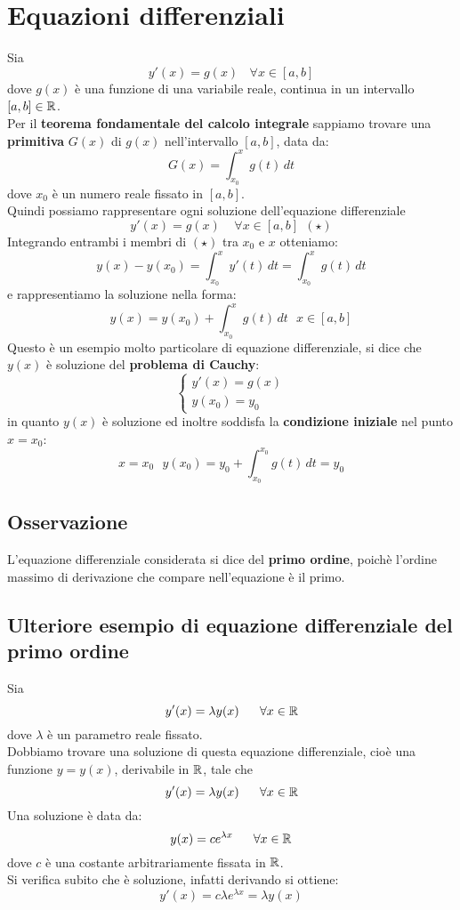 \documentclass[../main.tex]{subfiles}
\begin{document}
\section{Equazioni differenziali}
Sia
\[
    y'(x) = g(x) \ \ \ \ \forall x \in [a, b]
\]
dove $g(x)$ è una funzione di una variabile reale, continua in un intervallo
$[a, b] \in \mathbb{R}$.\\ Per il \textbf{teorema fondamentale del calcolo integrale}
sappiamo trovare una \textbf{primitiva} $G(x)$ di $g(x)$ nell'intervallo
$[a,b]$, data da:
\[
    G(x) = {\int_{x_0}^{x}  g(t)\,dt }
\]
dove $x_0$ è un numero reale fissato in $[a, b]$. \\ Quindi possiamo
rappresentare ogni soluzione dell'equazione differenziale
\[
    y'(x) = g(x) \ \ \ \ \ \forall x\in [a, b] \ \ (\star)
\]
Integrando entrambi i membri di $(\star)$ tra $x_0$ e $x$ otteniamo:
\[
    y(x)-y(x_0) = \int_{x_0}^{x} y'(t)\,dt = \int_{x_0}^{x} g(t)\,dt
\]
e rappresentiamo la soluzione nella forma:
\[
    y(x) = y(x_0) + \int_{x_0}^{x} g(t)\,dt \ \ \ x\in [a, b]
\]
Questo è un esempio molto particolare di equazione differenziale, si dice che
$y(x)$ è soluzione del \textbf{problema di Cauchy}:
\[
    \begin{cases}
        y'(x) = g(x) \\
        y(x_0) = y_0
    \end{cases}
\]
in quanto $y(x)$ è soluzione ed inoltre soddisfa la \textbf{condizione
    iniziale} nel punto $x = x_0$:
\[
    x = x_0 \ \ \ y(x_0) = y_0 + \int_{x_0}^{x_0} g(t)\,dt = y_0
\]
\subsection{Osservazione}
L'equazione differenziale considerata si dice del \textbf{primo ordine}, poichè
l'ordine massimo di derivazione che compare nell'equazione è il primo.

\subsection{Ulteriore esempio di equazione differenziale del primo ordine}
Sia
\[
    y'(x) = \lambda y(x) \ \ \ \ \ \forall x \in \R
\]
dove $\lambda$ è un parametro reale fissato. \\ Dobbiamo trovare una soluzione
di questa equazione differenziale, cioè una funzione $y = y(x)$, derivabile in
$\mathbb{R}$, tale che
\[
    y'(x) = \lambda y(x) \ \ \ \ \ \forall x \in \R
\]
Una soluzione è data da:
\[
    y(x) = ce^{\lambda x} \ \ \ \ \ \forall x \in \mathbb{R}
\]
dove $c$ è una costante arbitrariamente fissata in $\mathbb{R}$.\\ Si verifica subito
che è soluzione, infatti derivando si ottiene:
\[
    y'(x) = c\lambda e^{\lambda x} = \lambda y(x)
\]
\end{document}
